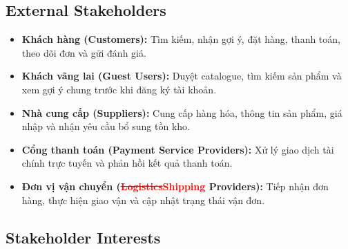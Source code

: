 \documentclass[12pt,a4paper,oneside]{report}
\newif\ifmark \marktrue
\newcommand{\chg}[1]{\ifmark\textcolor{red}{#1}\else #1\fi}
\newcommand{\del}[1]{\ifmark\textcolor{red}{\sout{#1}}\fi}
\begin{document}
\subsection{External Stakeholders}

\begin{itemize}
  \item \textbf{Khách hàng (Customers):} Tìm kiếm, nhận gợi ý, đặt hàng, thanh toán, theo dõi đơn và gửi đánh giá.
  \item \textbf{Khách vãng lai (Guest Users):} Duyệt catalogue, tìm kiếm sản phẩm và xem gợi ý chung trước khi đăng ký tài khoản.
  \item \textbf{Nhà cung cấp (Suppliers):} Cung cấp hàng hóa, thông tin sản phẩm, giá nhập và nhận yêu cầu bổ sung tồn kho.
  \item \textbf{Cổng thanh toán (Payment Service Providers):} Xử lý giao dịch tài chính trực tuyến và phản hồi kết quả thanh toán.
  \item \textbf{Đơn vị vận chuyển (\del{Logistics}\chg{Shipping} Providers):} Tiếp nhận đơn hàng, thực hiện giao vận và cập nhật trạng thái vận đơn.
\end{itemize}

\subsection{Stakeholder Interests}
\end{document}
